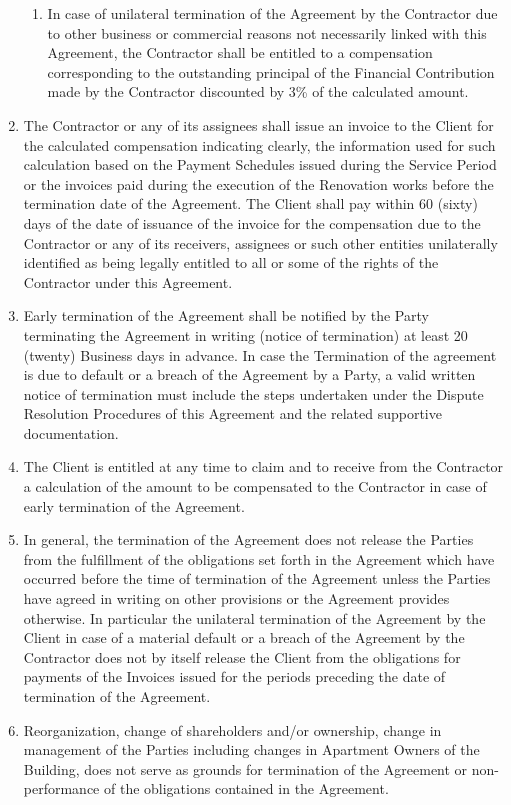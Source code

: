 \begin{multicols}{2}
\begin{enumerate}
\begin{enumerate}
		\item	In case of unilateral termination of the Agreement by the Contractor due to other business or commercial reasons not necessarily linked with this Agreement, the Contractor shall be entitled to a compensation corresponding to the outstanding principal of the Financial Contribution made by the Contractor discounted by 3\% of the calculated amount.
	\end{enumerate}
	\item	The Contractor or any of its assignees shall issue an invoice to the Client for the calculated compensation indicating clearly, the information used for such calculation based on the Payment Schedules issued during the Service Period or the invoices paid during the execution of the Renovation works before the termination date of the Agreement. The Client shall pay within 60 (sixty) days of the date of issuance of the invoice for the compensation due to the Contractor or any of its receivers, assignees or such other entities unilaterally identified as being legally entitled to all or some of the rights of the Contractor under this Agreement.
	\item	Early termination of the Agreement shall be notified by the Party terminating the Agreement in writing (notice of termination) at least 20 (twenty) Business days in advance. In case the Termination of the agreement is due to default or a breach of the Agreement by a Party, a valid written notice of termination must include the steps undertaken under the Dispute Resolution Procedures of this Agreement and the related supportive documentation.
	\item	The Client is entitled at any time to claim and to receive from the Contractor a calculation of the amount to be compensated to the Contractor in case of early termination of the Agreement.
	\item	In general, the termination of the Agreement does not release the Parties from the fulfillment of the obligations set forth in the Agreement which have occurred before the time of termination of the Agreement unless the Parties have agreed in writing on other provisions or the Agreement provides otherwise. In particular the unilateral termination of the Agreement by the Client in case of a material default or a breach of the Agreement by the Contractor does not by itself release the Client from the obligations for payments of the Invoices issued for the periods preceding the date of termination of the Agreement.
	\item	Reorganization, change of shareholders and/or ownership, change in management of the Parties including changes in Apartment Owners of the Building, does not serve as grounds for termination of the Agreement or non-performance of the obligations contained in the Agreement.

\end{enumerate}
\end{multicols}
